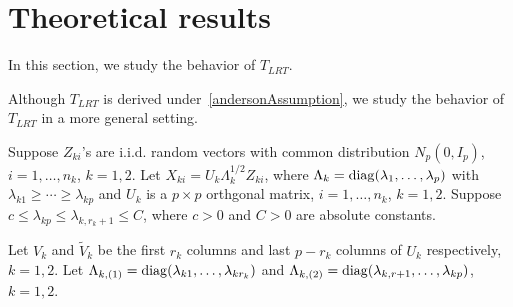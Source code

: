
\section{Theoretical results}

In this section, we study the behavior of $T_{LRT}$.

Although $T_{LRT}$ is derived under~\eqref{andersonAssumption}, we study the behavior of $T_{LRT}$ in a more general setting.

\begin{assumption}\label{newDataAssumption}
    Suppose $Z_{ki}$'s are i.i.d. random vectors with common distribution $N_p(0,I_p)$, $i=1,\ldots,n_k$, $k=1,2$.
    Let $X_{ki}=U_k\Lambda_k^{1/2}Z_{ki}$, where $\Lambda_k=\operatorname{diag}(\lambda_1,\ldots,\lambda_p)$ with $\lambda_{k1}\geq \cdots \geq \lambda_{kp}$ and $U_k$ is a $p\times p$ orthgonal matrix, $i=1,\ldots,n_k$, $k=1,2$.
    Suppose $c\leq \lambda_{kp} \leq \lambda_{k,r_k+1}\leq C$, where $c>0$ and $C>0$ are absolute constants.
\end{assumption}
    Let $V_k$ and $\tilde{V}_k$ be the first $r_k$ columns and last $p-r_k$ columns of $U_k$ respectively, $k=1,2$.
    Let $\Lambda_{k,(1)}=\operatorname{diag}(\lambda_{k1},\ldots,\lambda_{kr_k})$ and $\Lambda_{k,(2)}=\operatorname{diag}(\lambda_{k,r+1},\ldots,\lambda_{kp})$, $k=1,2$.

